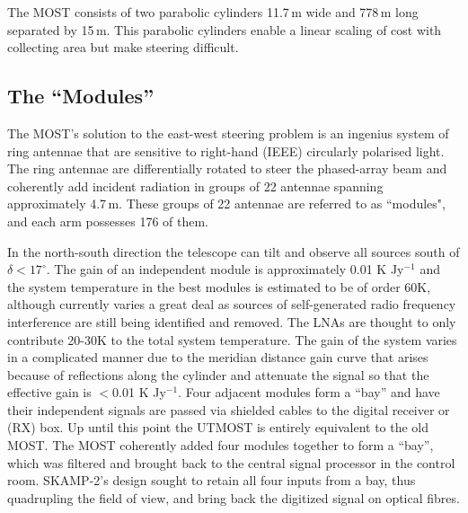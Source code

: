 
The MOST consists of two parabolic cylinders 11.7\,m wide and 778\,m long separated by 15\,m. This parabolic cylinders enable a linear scaling of cost with collecting area but make steering difficult.

\subsection{The ``Modules''}
The MOST's solution to the east-west steering problem is an ingenius system of ring antennae that are sensitive to right-hand (IEEE) circularly polarised light. The ring antennae are differentially rotated to steer the phased-array beam and coherently add incident radiation in groups of 22 antennae spanning approximately 4.7\,m. These groups of 22 antennae are referred to as ``modules", and each arm possesses 176 of them. 

In the north-south direction the telescope can tilt and observe all sources south of $\delta<17^\circ$. The gain of an independent module is approximately 0.01 K Jy$^{-1}$ and the system temperature in the best modules is estimated to be of order 60K, although currently varies a great deal as sources of self-generated radio frequency interference are still being identified and removed. The LNAs are thought to only contribute 20-30K to the total system temperature. The gain of the system varies in a complicated manner due to the meridian distance gain curve that arises because of reflections along the cylinder and attenuate the signal so that the effective gain is $<$0.01 K Jy$^{-1}$\cite{Hunstead_1996}.
Four adjacent modules form a ``bay'' and have their independent signals are passed via shielded cables to the digital receiver or (RX) box. Up until this point the UTMOST is entirely equivalent to the old MOST. The MOST coherently added four modules together to form a ``bay'', which was filtered and brought back to the central signal processor in the control room. SKAMP-2's design sought to retain all four inputs from a bay, thus quadrupling the field of view, and bring back the digitized signal on optical fibres.
